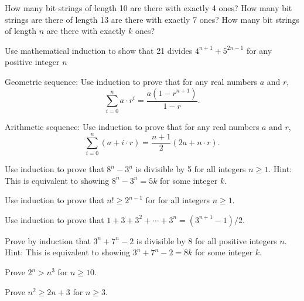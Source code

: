 \begin{exercise}
How many bit strings of length 10 are there with exactly 4 ones?  How many bit strings are there of length 13 are there with exactly 7 ones?  How many bit strings of length $n$ are there with exactly $k$ ones?
\end{exercise}

\begin{proofp}
Use mathematical induction to show that 21 divides $4^{n+1}+5^{2n-1}$ for any positive integer $n$
\end{proofp}

\begin{proofp}
Geometric sequence: Use induction to prove that for any real numbers $a$ and $r$, $$\sum_{i=0}^{n} a\cdot r^i = \frac{a(1-r^{n+1})}{1-r}.$$
\end{proofp}

\begin{proofp}
Arithmetic sequence: Use induction to prove that for any real numbers $a$ and $r$, $$\sum_{i=0}^{n} (a+ i\cdot r) = \frac{n+1}{2}(2a+n\cdot r).$$
\end{proofp}

\begin{proofp}
Use induction to prove that $8^n-3^n$ is divisible by 5 for all integers $n \ge 1$.  Hint:  This is equivalent to showing $8^n-3^n=5k$ for some integer $k$.
\end{proofp}


\begin{proofp}
Use induction to prove that $n! \ge 2^{n-1}$ for for all integers $n \ge 1$.
\end{proofp}

\begin{proofp}
Use induction to prove that $1+3+3^2+\cdots +3^n=(3^{n+1}-1)/2$.
\end{proofp}

\begin{proofp}
Prove by induction that $3^n+7^n-2$ is divisible by 8 for all positive integers $n$. Hint:  This is equivalent to showing $3^n+7^n-2=8k$ for some integer $k$.
\end{proofp}

\begin{proofp}
Prove $2^n>n^3$ for $n \ge 10$.
\end{proofp}

\begin{proofp}
Prove $n^2 \geq2n+3$ for $n \ge 3$.
\end{proofp}

